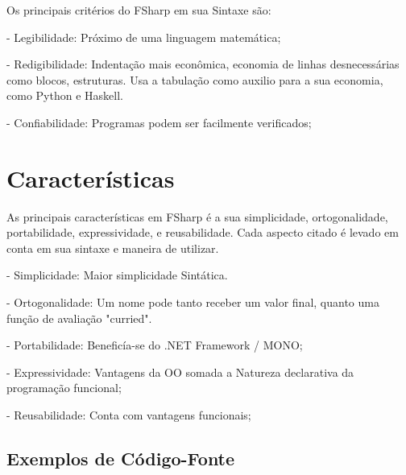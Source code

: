 \documentclass[12pt]{article}
\begin{document}
Os principais critérios do FSharp em sua Sintaxe são:

- Legibilidade: Próximo de uma linguagem matemática;

- Redigibilidade: Indentação mais econômica, economia de linhas desnecessárias como blocos, estruturas. Usa a tabulação como auxilio para a sua economia, como Python e Haskell.

- Confiabilidade: Programas podem ser facilmente verificados;


\section{Características}

As principais características em FSharp é a sua simplicidade, ortogonalidade, portabilidade, expressividade, e reusabilidade. Cada aspecto citado é levado em conta em sua sintaxe e maneira de utilizar.

- Simplicidade: Maior simplicidade Sintática.

- Ortogonalidade: Um nome pode tanto receber um valor final, quanto uma função de avaliação "curried".

- Portabilidade: Beneficía-se do .NET Framework / MONO;

- Expressividade: Vantagens da OO somada a Natureza declarativa da programação funcional;

- Reusabilidade: Conta com vantagens funcionais;

\subsection{Exemplos de Código-Fonte}
\end{document}
